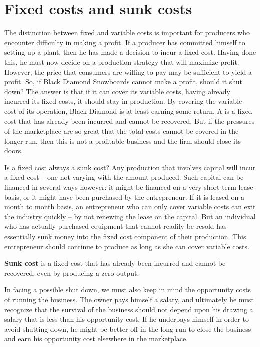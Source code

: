 \section{Fixed costs and sunk costs}\label{sec:ch8sec5}

The distinction between fixed and variable costs is important for producers who encounter difficulty in making a profit. If a producer has committed himself to setting up a plant, then he has made a decision to incur a fixed cost. Having done this, he must now decide on a production strategy that will maximize profit. However, the price that consumers are willing to pay may be sufficient to yield a profit. So, if Black Diamond Snowboards cannot make a profit, should it shut down? The answer is that if it can cover its variable costs, having already incurred its fixed costs, it should stay in production. By covering the variable cost of its operation, Black Diamond is at least earning some return. A  is a fixed cost that has already been incurred and cannot be recovered. But if the pressures of the marketplace are so great that the total costs cannot be covered in the longer run, then this is not a profitable business and the firm should close its doors. 

Is a fixed cost always a sunk cost? Any production that involves capital will incur a fixed cost -- one not varying with the amount produced. Such capital can be financed in several ways however: it might be financed on a very short term lease basis, or it might have been purchased by the entrepreneur. If it is leased on a month to month basis, an entrepreneur who can only cover variable costs can exit the industry quickly -- by not renewing the lease on the capital. But an individual who has actually purchased equipment that cannot readily be resold has essentially sunk money into the fixed cost component of their production. This entrepreneur should continue to produce as long as she can cover variable costs.

\begin{DefBox}
\textbf{Sunk cost} is a fixed cost that has already been incurred and cannot be recovered, even by producing a zero output.
\end{DefBox}

In facing a possible shut down, we must also keep in mind the opportunity costs of running the business. The owner pays himself a salary, and ultimately he must recognize that the survival of the business should not depend upon his drawing a salary that is less than his opportunity cost. If he underpays himself in order to avoid shutting down, he might be better off in the long run to close the business and earn his opportunity cost elsewhere in the marketplace. 

